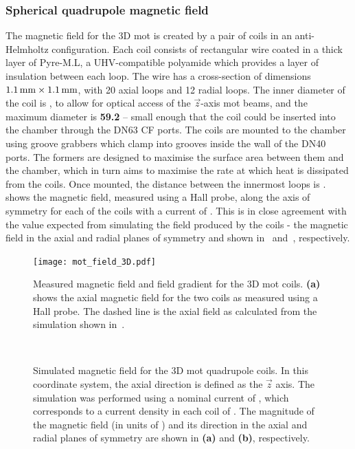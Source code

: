 \subsubsection{Spherical quadrupole magnetic field}
The magnetic field for the 3D \ac{mot} is created by a pair of coils in an
anti-Helmholtz configuration. Each coil consists of rectangular wire coated in a
 thick layer of Pyre-M.L, a UHV-compatible polyamide
which provides a layer of insulation between each loop. The wire has a
cross-section of dimensions \(\sivalue{1.1}{\milli\metre} \times
\sivalue{1.1}{\milli\metre}\), with 20 axial loops and 12 radial loops. The
inner diameter of the coil is , to allow for optical
access of the \(\vec{z}\)-axis \ac{mot} beams, and the maximum diameter is
\textbf{59.2}\sivalue{}{\milli\metre} -- small enough that the coil could be
inserted into the chamber through the DN63 CF ports. The coils are mounted to
the chamber using groove grabbers which clamp into grooves inside the wall of
the DN40 ports. The formers are designed to maximise the surface area between
them and the chamber, which in turn aims to maximise the rate at which heat is
dissipated from the coils. Once mounted, the distance between the innermost
loops is .  shows the
magnetic field, measured using a Hall probe, along the axis of symmetry for each
of the coils with a current of . This is in close
agreement with the value expected from simulating the field produced by the
coils - the magnetic field in the axial and radial planes of symmetry and shown
in~ and~, respectively.
\begin{figure}[!htbp]
	\centering
	\def\svgwidth{\columnwidth}
	\texttt{[image: mot\_field\_3D.pdf]}
	\caption[Measured magnetic field and field gradient for the 3D \ac{mot}
		coils]{Measured magnetic field and field gradient for the 3D \ac{mot}
		coils. \textbf{(a)} shows the axial magnetic field for the two coils as
		measured using a Hall probe. The dashed line is the axial field as
		calculated from the simulation shown
		in~.}
	\label{fig:mot_coil_plots}
\end{figure}
\begin{figure}[!htbp]
	\centering
	\def\svgwidth{\columnwidth}
	\\
	\caption[Simulated magnetic field for the 3D \ac{mot} quadrupole
		coils]{Simulated magnetic field for the 3D \ac{mot} quadrupole coils. In
		this coordinate system, the axial direction is defined as the
		\(\vec{z}\) axis. The simulation was performed using a nominal current
		of , which corresponds to a current density in
		each coil of . The
		magnitude of the magnetic field (in units of \sivalue{}{\gauss}) and its
		direction in the axial and radial planes of symmetry are shown in
		\textbf{(a)} and
		\textbf{(b)}, respectively.}
	\label{fig:3D_mot_field_sim}
\end{figure}

